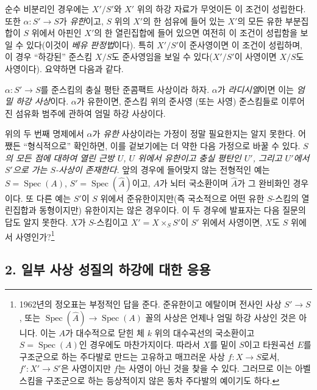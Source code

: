 순수 비분리인 경우에는 $X'/S'$와 $X'$ 위의 하강 자료가 무엇이든
이 조건이 성립한다. 또한 $\alpha:S'\longrightarrow S$가
\emph{유한}이고, $S$ 위의 $X'$의 한 섬유에 들어 있는 $X'$의 모든
유한 부분집합이 $S$ 위에서 아핀인 $X'$의 한 열린집합에 들어 있으면
여전히 이 조건이 성립함을 보일 수 있다(이것이 \emph{베유 판정법}이다).
특히 $X'/S'$이 준사영이면 이 조건이 성립하며, 이 경우 “하강된”
준스킴 $X/S$도 준사영임을 보일 수 있다($X'/S'$이 사영이면 $X/S$도
사영이다). 요약하면 다음과 같다.

 $\alpha:S'\longrightarrow S$를 준스킴의 충실 평탄
준콤팩트 사상이라 하자. $\alpha$가 \emph{라디시엘}이면 이는
\emph{엄밀 하강 사상}이다. $\alpha$가 유한이면, 준스킴 위의 준사영
(또는 사영) 준스킴들로 이루어진 섬유화 범주에 관하여 엄밀 하강
사상이다.

 위의 두 번째 명제에서 $\alpha$가 \emph{유한} 사상이라는
가정이 정말 필요한지는 알지 못한다. 어쨌든 “형식적으로” 확인하면,
이를 겉보기에는 더 약한 다음 가정으로 바꿀 수 있다. \emph{$S$의 모든
점에 대하여 열린 근방 $U$, $U$ 위에서 유한이고 충실 평탄인 $U'$,
그리고 $U'$에서 $S'$으로 가는 $S$-사상이 존재한다.} 앞의 경우에
들어맞지 않는 전형적인 예는
$S=\operatorname{Spec}(A)$,
$S'=\operatorname{Spec}(\widehat A)$이고, $A$가 뇌터 국소환이며
$\widehat A$가 그 완비화인 경우이다. 또 다른 예는 $S'$이 $S$ 위에서
준유한이지만(즉 국소적으로 어떤 유한 $S$-스킴의 열린집합과
동형이지만) 유한이지는 않은 경우이다. 이 두 경우에 발표자는 다음
질문의 답도 알지 못한다. $X$가 $S$-스킴이고
$X'=X\times_SS'$이 $S'$ 위에서 사영이면, $X$도 $S$ 위에서
사영인가?\footnote{1962년의 정오표는 부정적인 답을 준다.
준유한이고 에탈이며 전사인 사상 $S'\longrightarrow S$, 또는
$\operatorname{Spec}(\widehat A)\longrightarrow\operatorname{Spec}(A)$
꼴의 사상은 언제나 엄밀 하강 사상인 것은 아니다. 이는 $A$가
대수적으로 닫힌 체 $k$ 위의 대수곡선의 국소환이고
$S=\operatorname{Spec}(A)$인 경우에도 마찬가지이다. 따라서
$X$를 밑이 $S$이고 타원곡선 $E$를 구조군으로 하는 주다발로 만드는 고유하고
매끄러운 사상 $f:X\longrightarrow S$로서,
$f':X'\longrightarrow S'$은 사영이지만 $f$는 사영이 아닌 것을
찾을 수 있다. 그러므로 이는 아벨 스킴을 구조군으로 하는 등상적이지
않은 동차 주다발의 예이기도 하다.}

\subsection*{2. 일부 사상 성질의 하강에 대한 응용}

